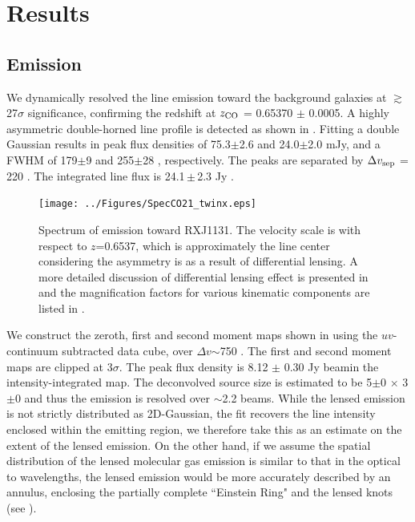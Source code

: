 \documentclass[]{emulateapj}
\begin{document}
\section{Results}
\subsection{\bco Emission} \label{sec:CO21} %
We dynamically resolved the \bco line emission toward the background galaxies
at $\gtrsim$27$\sigma$ significance, confirming the redshift at $z_{\rm CO}$ =
0.65370 $\pm$ 0.0005. A highly asymmetric double-horned line profile is
detected as shown in . Fitting a double Gaussian results in peak
flux densities of 75.3$\pm$2.6 and 24.0$\pm$2.0 mJy, and a FWHM of
179$\pm$9 \kms and 255$\pm$28 \kms, respectively. The peaks are separated by
$\Delta v_{\rm sep}$ = 220 \kms. The integrated line flux is 24.1\,$\pm$\,2.3 Jy \kms. %

\begin{figure}[tbph]
\centering
\texttt{[image: ../Figures/SpecCO21\_twinx.eps]}
\caption{ Spectrum of \bco emission toward RXJ1131. The velocity scale
is with respect to $z$=0.6537, which is approximately the line center
considering the asymmetry is as a result of differential lensing.
A more detailed discussion of differential lensing effect is presented in
 and the magnification factors for various kinematic
components are listed in .
 \label{fig:CO21spec}}
\end{figure}

We construct the zeroth, first and second moment maps shown in 
using the $uv$-continuum subtracted data cube, over $\Delta v$$\sim$750 \kms.
The first and second moment maps are clipped at 3$\sigma$.
The peak flux density is 8.12 $\pm$ 0.30 Jy\,\kms\,beam\pmOne in the intensity-integrated
map. The deconvolved source size is estimated to be 5$\pm$0 $\times$ 3$\pm$0
and thus the emission is resolved over $\sim$2.2 beams.
While the lensed emission is not strictly distributed as 2D-Gaussian,
the fit recovers the line intensity enclosed within the emitting
region, we therefore take this as an estimate on the extent of the lensed
emission. On the other hand, if we assume the spatial distribution of
the lensed molecular gas emission is similar to that in the optical to \nir
wavelengths, the lensed emission would be more accurately described by an
annulus, enclosing the partially complete ``Einstein Ring" and
the lensed knots (see ).
\end{document}
